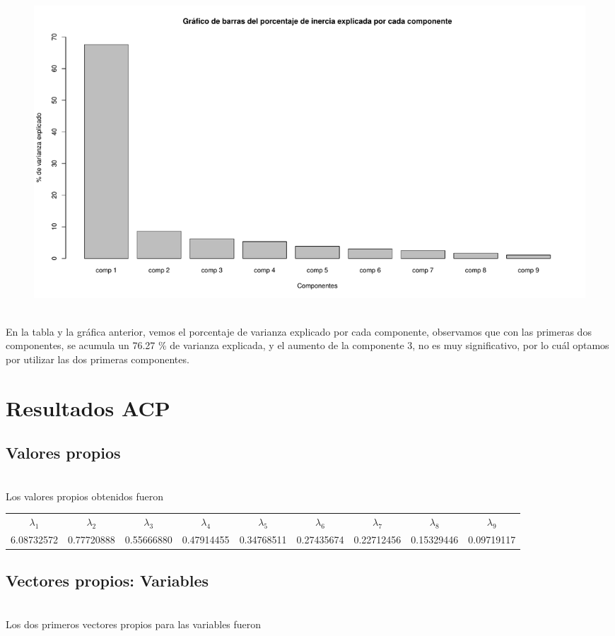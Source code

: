 \documentclass[report,oneside]{revcoles}
\begin{document}
\begin{figure}[h!]
  \centering
  \includegraphics[scale=0.45]{FigurasUV/varianza.pdf}
\end{figure}

~\\En la tabla y la gráfica anterior, vemos el porcentaje de varianza explicado por cada componente, observamos que con las primeras dos componentes, se acumula un 76.27 \% de varianza explicada, y el aumento de la componente 3, no es muy significativo, por lo cuál optamos por utilizar las dos primeras componentes.

\section{Resultados ACP}
\subsection{Valores propios}
~\\Los valores propios obtenidos fueron

\begin{center}
\resizebox{17cm}{!} {
\begin{tabular}{|ccccccccc|}
\hline 
$\lambda_1$ & $\lambda_2$ & $\lambda_3$ & $\lambda_4$ & $\lambda_5$ & $\lambda_6$ & $\lambda_7$ & $\lambda_8$ & $\lambda_9$ \\ 
6.08732572 & 0.77720888 & 0.55666880 & 0.47914455 & 0.34768511 & 0.27435674 & 0.22712456  & 0.15329446 & 0.09719117 \\ 
\hline 
\end{tabular} 
}
\end{center}
\pagebreak
\subsection{Vectores propios: Variables}
~\\Los dos primeros vectores propios para las variables fueron
\end{document}

